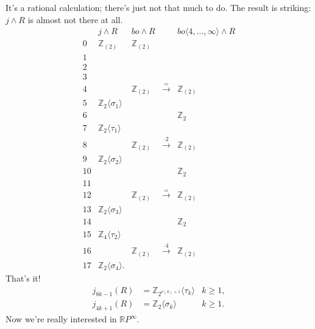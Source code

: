 \documentclass{article}
\newcommand{\Z}{\mathbb{Z}}
\newcommand{\R}{\mathbb{R}}
\newcommand{\RP}{\R P}
\newcommand{\sprod}{\wedge}
\renewcommand{\to}{\longrightarrow}
\theoremstyle{definition}
\begin{document}
It's a rational calculation; there's just not that much to do.  The result is striking: $j \sprod R$ is almost not there at all.
\[
\begin{array}{ccccc}
& j \sprod R & bo \sprod R & & bo \langle 4, \ldots, \infty \rangle \sprod R \\
0 & \Z_{(2)} & \Z_{(2)} \\
1 \\
2 \\
3 \\
4 & & \Z_{(2)} & \stackrel{=}{\to} & \Z_{(2)} \\
5 & \Z_2 \langle \sigma_1 \rangle \\
6 & & & & \Z_2 \\
7 & \Z_2 \langle \tau_1 \rangle \\
8 & & \Z_{(2)} & \stackrel{\cdot 2}{\to} & \Z_{(2)} \\
9 & \Z_2 \langle \sigma_2 \rangle \\
10 & & & & \Z_2 \\
11 \\
12 & & \Z_{(2)} & \stackrel{=}{\to} & \Z_{(2)} \\
13 & \Z_2 \langle \sigma_3 \rangle \\
14 & & & & \Z_2 \\
15 & \Z_4 \langle \tau_2 \rangle \\
16 & & \Z_{(2)} & \stackrel{\cdot 4}{\to} & \Z_{(2)} \\
17 & \Z_2 \langle \sigma_4 \rangle.
\end{array}
\]
That's it!
\begin{align*}
j_{8k-1}(R) & = \Z_{2^{\nu(k)+1}} \langle \tau_k \rangle & k \ge 1, \\
j_{4k+1}(R) & = \Z_2 \langle \sigma_k \rangle & k \ge 1.
\end{align*}
Now we're really interested in $\RP^\infty$.
\end{document}
